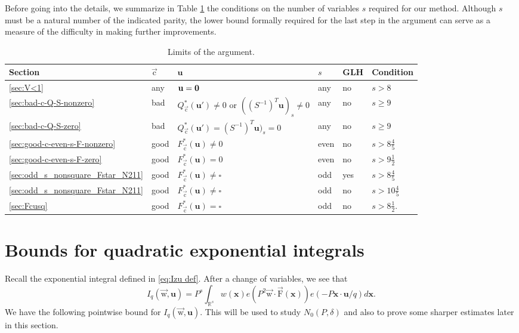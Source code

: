 \documentclass[letterpaper,11pt]{amsart}
\numberwithin{equation}{section}
\theoremstyle{definition}
\numberwithin{equation}{section}
\newcommand{\x}{\mathbf{x}}
\newcommand{\uu}{\mathbf{u}}
\newcommand{\uw}{{\vec{\mathrm{w}}}}
\newcommand{\uF}{{\vec{\mathrm{F}} }}
\newcommand{\uc}{{\vec{\mathrm{c}}}}
\def\vecnull{{\text{\boldmath$0$}}}
\newcommand{\R}{\mathbb{R}}
\newcommand{\nF}{\uF}
\begin{document}
Before going into the details, we summarize in Table \ref{tab:limits} the conditions on the number of variables $s$ required for our method. Although $s$ must be a natural number of the indicated parity, the lower bound formally required for the last step in the argument can serve as a measure of the difficulty in making further improvements.
\begin{table}[htbp]
\renewcommand{\arraystretch}{1.5}
\centering
\begin{tabular}{ llllll }
Section         &$\uc$  &$\uu$                      &$s$    &GLH    &Condition
\\
\hline
\ref{sec:V<1}   &any      &$\uu=\vecnull$             &any      &no     &$s>8$
\\
\ref{sec:bad-c-Q-S-nonzero}
                &bad    &$Q_\uc^*(\uu')\neq 0 \text{ or }((S^{-1})^T\uu)_s\neq 0$
                                                    &any     &no     &$s\geq 9$
\\
\ref{sec:bad-c-Q-S-zero}
                &bad    &$Q_\uc^*(\uu')=(S^{-1})^T\uu)_s=0$
                                                    &any      &no     &$s\geq 9$
                                                    \\
\ref{sec:good-c-even-s-F-nonzero}
                &good   &$F_\uc^*(\uu)\neq 0$       &even   &no     &$s>8\frac 45$
\\
\ref{sec:good-c-even-s-F-zero}
                &good   &$F_\uc^*(\uu)=0$           &even   &no     &$s>9\frac 12$
\\
\ref{sec:odd_s_nonsquare_Fstar_N211}
                &good   &$F_\uc^*(\uu)\neq\square$  &odd    &yes    &$s>8\frac 45$
\\                
\ref{sec:odd_s_nonsquare_Fstar_N211}
                &good   &$F_\uc^*(\uu)\neq\square$  &odd    &no    &$s>10\frac 45$
\\
\ref{sec:Fcusq} &good   &$F_\uc^*(\uu)=\square$     &odd    &no   &$s>8\frac 12$.

\end{tabular}
\vspace{\baselineskip}
\caption{Limits of the argument. }
\label{tab:limits}
\end{table}


\section{Bounds for quadratic exponential integrals}\label{sec:exp integral}


Recall the exponential integral defined in \eqref{eq:Izu def}. After a change of variables, we see that
\[I_q(\uw, \uu)=P^s\int_{\R^s}w\left(\x\right)e(P^2\uw\cdot \nF(\x))e(-P\x\cdot\uu/q)d\x.\]
We have the following pointwise bound for $I_{q}(\uw, \uu)$. This will be used to study  $N_0(P,\delta)$ and also to prove some sharper estimates later in this section.
\end{document}
